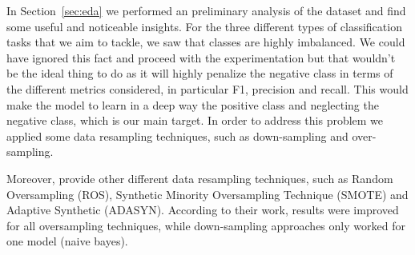 
In Section~\ref{sec:eda} we performed an preliminary analysis of the dataset and find some useful and noticeable insights. For the three different types of classification tasks that we aim to tackle, we saw that classes are highly imbalanced. We could have ignored this fact and proceed with the experimentation but that wouldn't be the ideal thing to do as it will highly penalize the negative class in terms of the different metrics considered, in particular F1, precision and recall. This would make the model to learn in a deep way the positive class and neglecting the negative class, which is our main target. In order to address this problem we applied some data resampling techniques, such as down-sampling and over-sampling.

Moreover, \cite{rathpisey-2019} provide other different data resampling techniques, such as Random Oversampling (ROS),  Synthetic Minority Oversampling Technique 
(SMOTE) and Adaptive Synthetic (ADASYN). According to their work, results were improved for all oversampling techniques, while down-sampling approaches only worked for one model (naive bayes).

